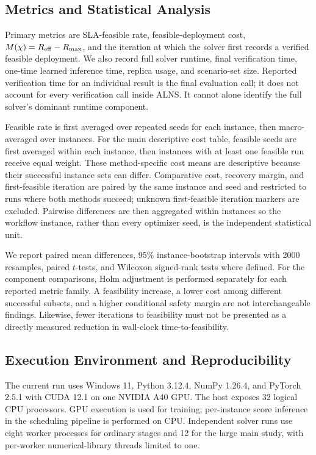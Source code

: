 \subsection{Metrics and Statistical Analysis}
Primary metrics are SLA-feasible rate, feasible-deployment cost,
$M(\chi)=R_{\mathrm{eff}}-R_{\max}$, and the iteration at which the solver first records a
verified feasible deployment. We also record full solver runtime, final
verification time, one-time learned inference time, replica usage, and
scenario-set size. Reported verification time for an individual result is
the final evaluation call; it does not account for every verification call
inside ALNS. It cannot alone identify the full solver's dominant runtime
component.

Feasible rate is first averaged over repeated seeds for each instance, then
macro-averaged over instances. For the main descriptive cost table, feasible
seeds are first averaged within each instance, then instances with at least
one feasible run receive equal weight. These method-specific cost means are
descriptive because their successful instance sets can differ. Comparative
cost, recovery margin, and first-feasible iteration are paired by the same
instance and seed and restricted to runs where both methods succeed; unknown
first-feasible iteration markers are excluded. Pairwise differences are then
aggregated within instances so the workflow instance, rather than every
optimizer seed, is the independent statistical unit.

We report paired mean differences, 95\% instance-bootstrap intervals with
2000 resamples, paired $t$-tests, and Wilcoxon signed-rank tests where defined.
For the component comparisons, Holm adjustment is performed separately for
each reported metric family. A feasibility increase, a lower cost among
different successful subsets, and a higher conditional safety margin are
not interchangeable findings. Likewise, fewer iterations to feasibility
must not be presented as a directly measured reduction in wall-clock
time-to-feasibility.

\subsection{Execution Environment and Reproducibility}
The current run uses Windows 11, Python 3.12.4, NumPy 1.26.4, and PyTorch
2.5.1 with CUDA 12.1 on one NVIDIA A40 GPU. The host exposes 32 logical CPU
processors. GPU execution is used for training; per-instance score inference
in the scheduling pipeline is performed on CPU. Independent solver runs use
eight worker processes for ordinary stages and 12 for the large main study,
with per-worker numerical-library threads limited to one.


